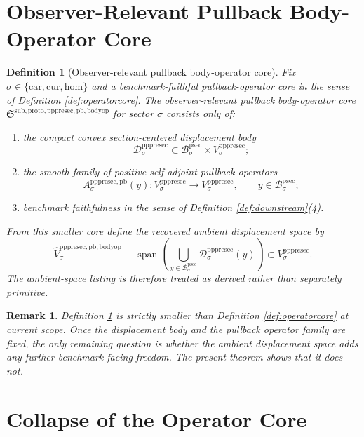 \documentclass[11pt]{article}
\newcommand{\Car}{\mathrm{car}}
\newcommand{\Cur}{\mathrm{cur}}
\newcommand{\Hom}{\mathrm{hom}}
\newcommand{\ProtoSectionBody}[1]{\mathcal B_{#1}^{\mathrm{psec}}}
\newcommand{\PrePreProtoSectionVertical}[1]{V_{#1}^{\mathrm{pppresec}}}
\newcommand{\PrePreProtoSectionResidualBody}[1]{\mathcal D_{#1}^{\mathrm{pppresec}}}
\newcommand{\PrePreProtoSectionPullbackOperator}[1]{A_{#1}^{\mathrm{pppresec,pb}}}
\newcommand{\PullbackBodyOperatorCore}{\mathfrak S^{\mathrm{sub,proto,pppresec,pb,bodyop}}}
\newcommand{\RecoveredBodyOperatorSpace}[1]{\widehat V_{#1}^{\mathrm{pppresec,pb,bodyop}}}
\newtheorem{definition}{Definition}
\newtheorem{remark}{Remark}
\begin{document}
\section{Observer-Relevant Pullback Body-Operator Core}

\begin{definition}[Observer-relevant pullback body-operator core]
\label{def:bodyop}
Fix \(\sigma\in\{\Car,\Cur,\Hom\}\) and a benchmark-faithful pullback-operator core in the sense of Definition \ref{def:operatorcore}. The \emph{observer-relevant pullback body-operator core} \(\PullbackBodyOperatorCore\) for sector \(\sigma\) consists only of:
\begin{enumerate}
    \item the compact convex section-centered displacement body
    \[
    \PrePreProtoSectionResidualBody{\sigma}
    \subset
    \ProtoSectionBody{\sigma}\times\PrePreProtoSectionVertical{\sigma};
    \]
    \item the smooth family of positive self-adjoint pullback operators
    \[
    \PrePreProtoSectionPullbackOperator{\sigma}(y):
    \PrePreProtoSectionVertical{\sigma}\to\PrePreProtoSectionVertical{\sigma},
    \qquad
    y\in\ProtoSectionBody{\sigma};
    \]
    \item benchmark faithfulness in the sense of Definition \ref{def:downstream}(4).
\end{enumerate}
From this smaller core define the recovered ambient displacement space by
\[
\RecoveredBodyOperatorSpace{\sigma}
\equiv
\operatorname{span}\left(
\bigcup_{y\in\ProtoSectionBody{\sigma}}
\PrePreProtoSectionResidualBody{\sigma}(y)
\right)
\subset
\PrePreProtoSectionVertical{\sigma}.
\]
The ambient-space listing is therefore treated as derived rather than separately primitive.
\end{definition}

\begin{remark}
Definition \ref{def:bodyop} is strictly smaller than Definition \ref{def:operatorcore} at current scope. Once the displacement body and the pullback operator family are fixed, the only remaining question is whether the ambient displacement space adds any further benchmark-facing freedom. The present theorem shows that it does not.
\end{remark}

\section{Collapse of the Operator Core}
\end{document}
